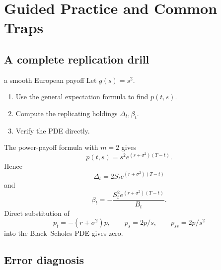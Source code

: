 \documentclass[10pt]{article}
\newcommand{\1}{\mathbf 1}
\theoremstyle{definition}
\begin{document}
\section{Guided Practice and Common Traps}

\subsection{A complete replication drill}

\begin{studentexercise}{a smooth European payoff}
Let \(g(s)=s^2\).
\begin{enumerate}
  \item Use the general expectation formula to find \(p(t,s)\).
  \item Compute the replicating holdings \(\Delta_t,\beta_t\).
  \item Verify the PDE directly.
\end{enumerate}
\end{studentexercise}
\begin{shortsolution}
The power-payoff formula with \(m=2\) gives
\[
p(t,s)=s^2e^{(r+\sigma^2)(T-t)}.
\]
Hence
\[
\Delta_t=2S_te^{(r+\sigma^2)(T-t)}
\]
and
\[
\beta_t
=-\frac{S_t^2e^{(r+\sigma^2)(T-t)}}{B_t}.
\]
Direct substitution of
\[
p_t=-(r+\sigma^2)p,\qquad
p_s=2p/s,\qquad
p_{ss}=2p/s^2
\]
into the Black--Scholes PDE gives zero.
\end{shortsolution}

\subsection{Error diagnosis}
\end{document}
